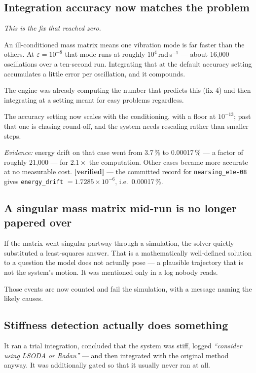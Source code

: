 \documentclass[11pt,a4paper]{article}
\newcommand{\evidence}[1]{\emph{Evidence:} #1}
\newcommand{\vconf}{\textcolor{okgreen}{\textbf{[verified]}}}
\begin{document}
\subsection{Integration accuracy now matches the problem}

\noindent\emph{This is the fix that reached zero.}

An ill-conditioned mass matrix means one vibration mode is far faster than the
others. At $\varepsilon = 10^{-8}$ that mode runs at roughly
$10^{4}$\,rad\,s$^{-1}$ --- about 16{,}000 oscillations over a ten-second run.
Integrating that at the default accuracy setting accumulates a little error per
oscillation, and it compounds.

The engine was already computing the number that predicts this (fix 4) and then
integrating at a setting meant for easy problems regardless.

The accuracy setting now scales with the conditioning, with a floor at
$10^{-13}$; past that one is chasing round-off, and the system needs rescaling
rather than smaller steps.

\evidence{energy drift on that case went from 3.7\,\% to 0.00017\,\% --- a
factor of roughly 21{,}000 --- for $2.1\times$ the computation. Other cases
became more accurate at no measurable cost.} \vconf{} --- the committed record
for \texttt{nearsing\_e1e-08} gives \texttt{energy\_drift}
$= 1.7285\times10^{-6}$, i.e.\ 0.00017\,\%.

\subsection{A singular mass matrix mid-run is no longer papered over}

If the matrix went singular partway through a simulation, the solver quietly
substituted a least-squares answer. That is a mathematically well-defined
solution to a question the model does not actually pose --- a plausible
trajectory that is not the system's motion. It was mentioned only in a log
nobody reads.

Those events are now counted and fail the simulation, with a message naming the
likely causes.

\subsection{Stiffness detection actually does something}

It ran a trial integration, concluded that the system was stiff, logged
\emph{``consider using LSODA or Radau''} --- and then integrated with the
original method anyway. It was additionally gated so that it usually never ran
at all.
\end{document}
